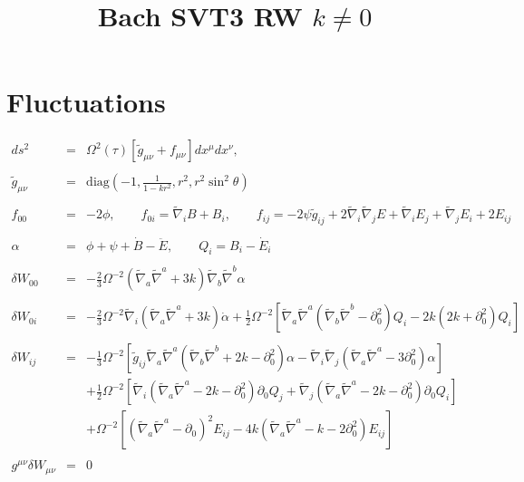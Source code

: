 \documentclass[10pt,letterpaper]{article}
\title{Bach SVT3 RW $k\ne 0$}
\date{}
\numberwithin{equation}{section}
\begin{document}
 
\maketitle
\noindent 
\section{Fluctuations}
%
\begin{eqnarray}
ds^2 &=& \Omega^2(\tau)\left[\tilde g_{\mu\nu}+f_{\mu\nu}\right] dx^\mu dx^\nu,\qquad 
\\ \nonumber\\
\tilde g_{\mu\nu} &=& \text{diag}\left(-1,\frac{1}{1-kr^2},r^2,r^2\sin^2\theta\right)
\\ \nonumber\\
f_{00} &=& -2\phi,\qquad f_{0i} = \tilde\nabla_i B + B_i,\qquad f_{ij} = -2\psi \tilde g_{ij} + 2\tilde\nabla_i\tilde\nabla_j E + 
\tilde\nabla_i E_j +\tilde\nabla_j E_i + 2E_{ij}
\label{svt}
\\ \nonumber\\
\alpha &=& \phi + \psi + \dot B - \ddot E,\qquad Q_i = B_i - \dot E_i
\\ \nonumber\\
\delta W_{00}&=& - \tfrac{2}{3} \Omega^{-2} (\tilde\nabla_a\tilde\nabla^a + 3k)\tilde\nabla_b\tilde\nabla^b \alpha
\\  \nonumber\\ 
\delta W_{0i}&=& -\tfrac23 \Omega^{-2}  \tilde\nabla_i (\tilde\nabla_a\tilde\nabla^a + 3k)\dot\alpha
+\tfrac12 \Omega^{-2}\left[ \tilde\nabla_a\tilde\nabla^a (\tilde\nabla_b \tilde\nabla^b-\partial_0^2)Q_i -2k(2k+\partial_0^2)Q_i\right]
\\  \nonumber\\ 
\delta W_{ij}&=& -\tfrac{1}{3} \Omega^{-2} \left[ \tilde g_{ij} \tilde\nabla_a\tilde\nabla^a (\tilde\nabla_b \tilde\nabla^b +2k-\partial_0^2)\alpha - \tilde\nabla_i\tilde\nabla_j(\tilde\nabla_a\tilde\nabla^a - 3\partial_0^2)\alpha \right]
\nonumber\\
&& +\tfrac12 \Omega^{-2} \left[ \tilde\nabla_i ( \tilde\nabla_a\tilde\nabla^a -2k-\partial_0^2) \partial_0 Q_j 
+  \tilde\nabla_j ( \tilde\nabla_a\tilde\nabla^a -2k-\partial_0^2) \partial_0 Q_i\right]
\nonumber\\
&&+ \Omega^{-2}\left[ (\tilde\nabla_a\tilde\nabla^a-\partial_0)^2 E_{ij} - 4k (\tilde\nabla_a\tilde\nabla^a - k-2\partial_0^2)E_{ij} \right]
\\  \nonumber\\ 
g^{\mu\nu}\delta W_{\mu\nu}&=& 0
\end{eqnarray}
\end{document}
